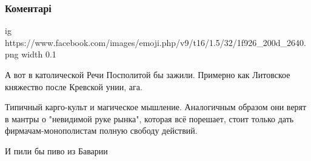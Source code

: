  
 
 
 
 
\subsubsection{Коментарі}
\label{sec:25_08_2021.fb.marchenko_dmitrij.1.ukraina_kirillica_bednost.cmt}

\begin{itemize}
 
\ifcmt
  ig https://www.facebook.com/images/emoji.php/v9/t16/1.5/32/1f926_200d_2640.png
  width 0.1
\fi

 
А вот в католической Речи Посполитой бы зажили. Примерно как Литовское княжество после Кревской унии, ага.

 
Типичный карго-культ и магическое мышление. Аналогичным образом они верят в мантры о "невидимой руке рынка", которая всё порешает, стоит только дать фирмачам-монополистам полную свободу действий.

 
И пили бы пиво из Баварии


\end{itemize}
